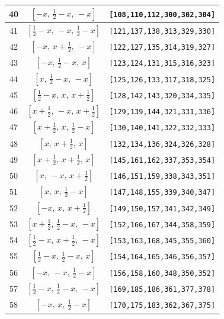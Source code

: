 \documentclass[fleqn,8pt]{jsarticle}
\begin{document}
\begin{longtable}{ccc}
40 & $\left[ - x,\, \frac{1}{2} - x,\, - x \right]$ & {\tt [108,110,112,300,302,304]} \\ \hline
41 & $\left[ \frac{1}{2} - x,\, - x,\, \frac{1}{2} - x \right]$ & {\tt [121,137,138,313,329,330]} \\ \hline
42 & $\left[ - x,\, x + \frac{1}{2},\, - x \right]$ & {\tt [122,127,135,314,319,327]} \\ \hline
43 & $\left[ - x,\, \frac{1}{2} - x,\, x \right]$ & {\tt [123,124,131,315,316,323]} \\ \hline
44 & $\left[ x,\, \frac{1}{2} - x,\, - x \right]$ & {\tt [125,126,133,317,318,325]} \\ \hline
45 & $\left[ \frac{1}{2} - x,\, x,\, x + \frac{1}{2} \right]$ & {\tt [128,142,143,320,334,335]} \\ \hline
46 & $\left[ x + \frac{1}{2},\, - x,\, x + \frac{1}{2} \right]$ & {\tt [129,139,144,321,331,336]} \\ \hline
47 & $\left[ x + \frac{1}{2},\, x,\, \frac{1}{2} - x \right]$ & {\tt [130,140,141,322,332,333]} \\ \hline
48 & $\left[ x,\, x + \frac{1}{2},\, x \right]$ & {\tt [132,134,136,324,326,328]} \\ \hline
49 & $\left[ x + \frac{1}{2},\, x + \frac{1}{2},\, x \right]$ & {\tt [145,161,162,337,353,354]} \\ \hline
50 & $\left[ x,\, - x,\, x + \frac{1}{2} \right]$ & {\tt [146,151,159,338,343,351]} \\ \hline
51 & $\left[ x,\, x,\, \frac{1}{2} - x \right]$ & {\tt [147,148,155,339,340,347]} \\ \hline
52 & $\left[ - x,\, x,\, x + \frac{1}{2} \right]$ & {\tt [149,150,157,341,342,349]} \\ \hline
53 & $\left[ x + \frac{1}{2},\, \frac{1}{2} - x,\, - x \right]$ & {\tt [152,166,167,344,358,359]} \\ \hline
54 & $\left[ \frac{1}{2} - x,\, x + \frac{1}{2},\, - x \right]$ & {\tt [153,163,168,345,355,360]} \\ \hline
55 & $\left[ \frac{1}{2} - x,\, \frac{1}{2} - x,\, x \right]$ & {\tt [154,164,165,346,356,357]} \\ \hline
56 & $\left[ - x,\, - x,\, \frac{1}{2} - x \right]$ & {\tt [156,158,160,348,350,352]} \\ \hline
57 & $\left[ \frac{1}{2} - x,\, \frac{1}{2} - x,\, - x \right]$ & {\tt [169,185,186,361,377,378]} \\ \hline
58 & $\left[ - x,\, x,\, \frac{1}{2} - x \right]$ & {\tt [170,175,183,362,367,375]} \\ \hline

\end{longtable}
\end{document}
